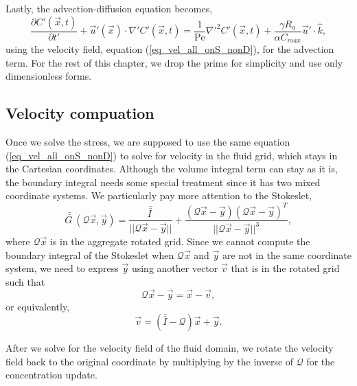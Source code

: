 \par
Lastly, the advection-diffusion equation becomes, 
	\begin{equation}
	\frac{\partial C'(\vec{x},t)}{\partial t'}
	+ \vec{u}'(\vec{x}) \cdot \nabla' C'(\vec{x},t)
	 = \frac{1}{\textrm{Pe}} {\nabla'}^2 C'(\vec{x},t)
	 +\frac{\gamma R_a}{ \alpha C_{max}} \vec{u}' \cdot \hat{k},
	\label{eq_AD_nonD}
	\end{equation}
using the velocity field, equation (\ref{eq_vel_all_onS_nonD}), for the advection term.
For the rest of this chapter, we drop the prime for simplicity and use only dimensionless forms. 

\subsection{Velocity compuation}
Once we solve the stress, we are supposed to use the same 
equation (\ref{eq_vel_all_onS_nonD}) 
to solve for velocity in the fluid grid, which stays in the Cartesian coordinates.
Although the volume integral term can stay as it is,  
the boundary integral needs some special treatment
since it has two mixed coordinate systems.
We particularly pay more attention to the Stokeslet,
\[
	\bar{\bar{G \ }} (\mathcal{Q}\vec{x},\vec{y}) 
	= 
	\frac{\bar{\bar{I \ }}}{||\mathcal{Q}\vec{x}-\vec{y} ||} 
	+ \frac{(\mathcal{Q}\vec{x}-\vec{y})(\mathcal{Q}\vec{x}-\vec{y})^T}{||\mathcal{Q}\vec{x}-\vec{y} ||^3}, 	 
\]
where $\mathcal{Q}\vec{x}$ is in the aggregate rotated grid. Since we cannot compute the boundary integral of the Stokeslet when $\mathcal{Q}\vec{x}$ and $\vec{y}$ are not in the same coordinate system, we need to express $\vec{y}$ using another vector $\vec{v}$ that is in the rotated grid such that 
\[
	\mathcal{Q}\vec{x} - \vec{y} = \vec{x} - \vec{v},
\]
or equivalently,
\[
	\vec{v} = \left(   \bar{\bar{I}} - \mathcal{Q} \right) \vec{x}  + \vec{y}.
\]

After we solve for the velocity field of the fluid domain, we rotate the velocity field back to the original coordinate by multiplying by the inverse of $\mathcal{Q}$ for the concentration update. 
